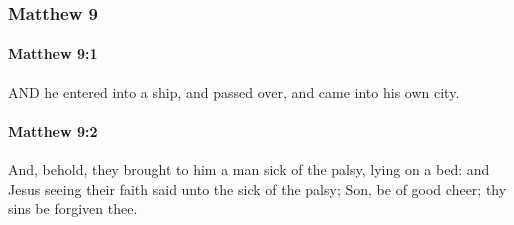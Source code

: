 	\subsubsection{Matthew 9} %
		\label{MATTHEW-9}
		
		\paragraph{Matthew 9:1} %
			\label{MATTHEW-9-1}

			AND he entered into a ship, and passed over, and came into his own city.

			\begin{framed}
			\scriptsize
				\begin{compactdesc}
					\item[SBLG] 
				\end{compactdesc}
			\end{framed}

		\paragraph{Matthew 9:2} %
			\label{MATTHEW-9-2}

			And, behold, they brought to him a man sick of the palsy, lying on a bed: and Jesus seeing their faith said unto the sick of the palsy; Son, be of good cheer; thy sins be forgiven thee.

